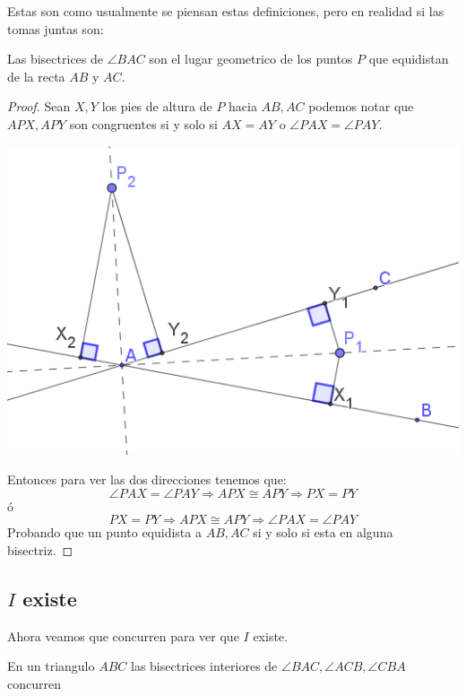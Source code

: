 \documentclass[11pt]{scrartcl}
\begin{document}
Estas son como usualmente se piensan estas definiciones, pero en realidad si las tomas juntas son:

\begin{claim}
    Las bisectrices de $\angle BAC$ son el lugar geometrico de los puntos $P$ que equidistan de la recta $AB$ y $AC$. 
\end{claim}

\begin{proof}
    Sean $X,Y$ los pies de altura de $P$ hacia $AB,AC$ podemos notar que $APX, APY$ son congruentes si y solo si $AX=AY$ o $\angle PAX=\angle PAY$. \\
   
    \begin{center}
        \includegraphics[scale=0.8]{PNAC6.png}
    \end{center}

    Entonces para ver las dos direcciones tenemos que:
    \[\angle PAX=\angle PAY \Rightarrow  APX \cong APY \Rightarrow PX=PY\]
    \'o 
    \[PX=PY \Rightarrow APX \cong APY \Rightarrow \angle PAX=\angle PAY\]
    Probando que un punto equidista a $AB,AC$ si y solo si esta en alguna bisectriz.
\end{proof}

\subsection{$I$ existe}

Ahora veamos que concurren para ver que $I$ existe.

\begin{claim}
    En un triangulo $ABC$ las bisectrices interiores de $\angle BAC, \angle ACB, \angle CBA$ concurren
\end{claim}
\end{document}
